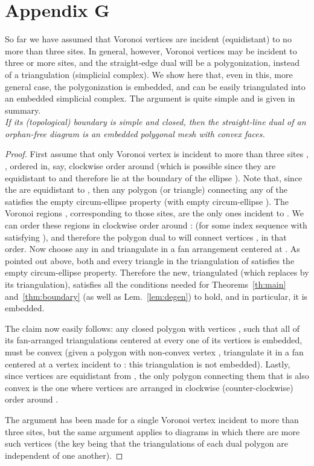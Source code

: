 \documentclass[11pt]{article}
\begin{document}
\section*{Appendix G}\label{app:generic}



	So far we have assumed that Voronoi vertices are incident (equidistant) to no more than three sites. 
	In general, however, Voronoi vertices may be incident to three or more sites, and the straight-edge dual 
	 will be a polygonization, instead of a triangulation (simplicial complex). 
	We show here that, even in this, more general case, the polygonization  is embedded, and can 
	be easily triangulated into  an embedded simplicial complex. 
	The argument is quite simple and is given in summary. \\



\emph{
If its (topological) boundary is simple and closed, then the straight-line dual  of an orphan-free diagram is an  embedded polygonal mesh with convex faces. 
}
\begin{proof}
	First assume that only Voronoi vertex  is incident to more than three sites , , ordered in, say, clockwise order around  (which is possible since they are equidistant to  and therefore 
	lie at the boundary of the ellipse ). 
	Note that, since the  are equidistant to , then any polygon (or triangle) connecting any of the  
		satisfies the empty circum-ellipse property (with empty circum-ellipse ).  
	The  Voronoi regions , corresponding to those sites, are the only ones incident to . 
	We can order these regions in clockwise order around :  
	(for some index sequence  with  satisfying ), 
	and therefore the polygon  dual to  will connect vertices , in that order. 
	Now choose any  in  and triangulate  in a fan arrangement centered at . 
	As pointed out above, both  and every triangle in the triangulation of  satisfies the empty circum-ellipse property. 
	Therefore the new, triangulated  (which replaces  by its triangulation), 
	satisfies all the conditions needed for Theorems~\ref{th:main} and~\ref{thm:boundary} (as well as Lem.~\ref{lem:degen}) to hold, 
	and in particular, it is embedded. 


	The claim now easily follows: any closed polygon with vertices , 
		such that all of its fan-arranged triangulations centered at every one of its vertices is embedded, must be convex 
		(given a polygon with non-convex vertex , triangulate it in a fan centered at a vertex incident to : this triangulation is not embedded). 
	Lastly, since vertices  are equidistant from , the only polygon connecting them 
		that is also convex is the one where vertices are arranged in clockwise (counter-clockwise) order around . 

The argument has been made for a single Voronoi vertex incident to more than three sites, but the same argument applies to diagrams in which there are more such vertices 
	(the key being that the triangulations of each dual polygon are independent of one another). 
\end{proof}
\end{document}

